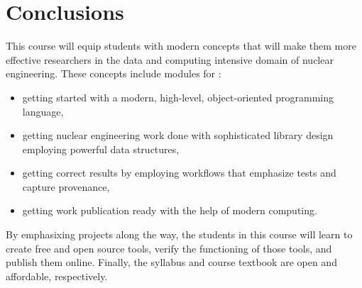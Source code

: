 \documentclass{anstrans}
\begin{document}
\section{Conclusions}

This course will equip students with modern concepts that will make them more effective researchers in the data and computing intensive domain of nuclear engineering. These concepts include modules for :

\begin{itemize}
\item getting started with a modern, high-level, object-oriented programming language,
\item getting nuclear engineering work done with sophisticated library design employing powerful data structures,
\item getting correct results by employing workflows that emphasize tests and capture provenance,
\item getting work publication ready with the help of modern computing.
\end{itemize}

By emphasixing projects along the way, the students in this course will learn
to create free and open source tools, verify the functioning of those tools,
and publish them online.  Finally, the syllabus and course textbook are open
and affordable, respectively.


 
\end{document}
